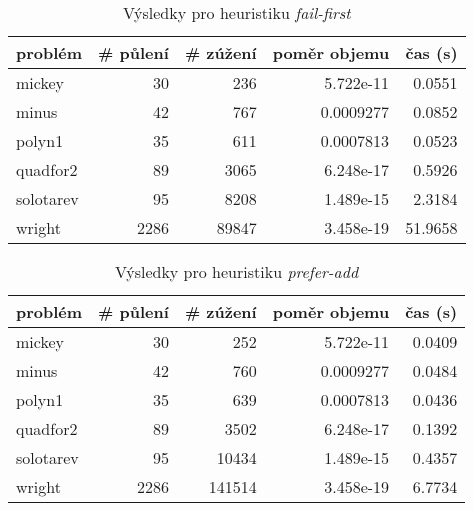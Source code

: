 {\begin{table}[H]
\centering
\begin{tabular}{lrrrr}
\hline
problém & \# půlení & \# zúžení & poměr objemu & čas (s) \\ \hline
mickey & 30 & 236 & 5.722e-11 & 0.0551 \\
minus & 42 & 767 & 0.0009277 & 0.0852 \\
polyn1 & 35 & 611 & 0.0007813 & 0.0523 \\
quadfor2 & 89 & 3065 & 6.248e-17 & 0.5926 \\
solotarev & 95 & 8208 & 1.489e-15 & 2.3184 \\
wright & 2286 & 89847 & 3.458e-19 & 51.9658 \\
\end{tabular}
\caption{Výsledky pro heuristiku \emph{fail-first}}
\label{fail-first}
\end{table}



\begin{table}[H]
\centering
\begin{tabular}{lrrrr}
\hline
problém & \# půlení & \# zúžení & poměr objemu & čas (s) \\ \hline
mickey & 30 & 252 & 5.722e-11 & 0.0409 \\
minus & 42 & 760 & 0.0009277 & 0.0484 \\
polyn1 & 35 & 639 & 0.0007813 & 0.0436 \\
quadfor2 & 89 & 3502 & 6.248e-17 & 0.1392 \\
solotarev & 95 & 10434 & 1.489e-15 & 0.4357 \\
wright & 2286 & 141514 & 3.458e-19 & 6.7734 \\
\end{tabular}
\caption{Výsledky pro heuristiku \emph{prefer-add}}
\label{prefer-add}
\end{table}



}
